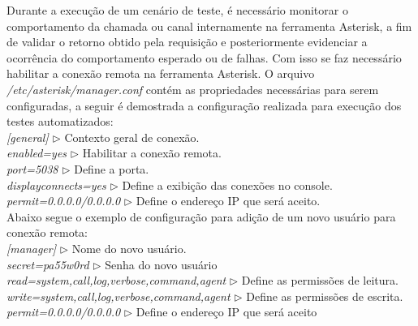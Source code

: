 Durante a execução de um cenário de teste, é necessário monitorar o comportamento da chamada ou canal internamente na ferramenta Asterisk,
a fim de validar o retorno obtido pela requisição e posteriormente evidenciar a ocorrência do comportamento esperado ou de falhas. Com isso se faz necessário habilitar a conexão remota na ferramenta Asterisk. O arquivo \textit{/etc/asterisk/manager.conf} contém as propriedades necessárias para serem configuradas, a seguir é demostrada a configuração realizada para execução dos testes automatizados:
\\
\hspace{10 mm}\textit{[general]} 			\hspace{10 mm} $\triangleright$ Contexto geral de conexão.\\
\hspace{10 mm}\textit{enabled=yes}  		\hspace{10 mm} $\triangleright$ Habilitar a conexão remota.\\
\hspace{10 mm}\textit{port=5038}  			\hspace{10 mm} $\triangleright$ Define a porta.\\
\hspace{10 mm}\textit{displayconnects=yes}  \hspace{10 mm} $\triangleright$ Define a exibição das conexões no console.\\
\hspace{10 mm}\textit{permit=0.0.0.0/0.0.0.0} \hspace{10 mm} $\triangleright$ Define o endereço IP que será aceito.\\

Abaixo segue o exemplo de configuração para adição de um novo usuário para conexão remota:
\\
\hspace{10 mm}\textit{[manager]} 	\hspace{10 mm} $\triangleright$ Nome do novo usuário.\\
\hspace{10 mm}\textit{secret=pa55w0rd} \hspace{10 mm} $\triangleright$ Senha do novo usuário \\
\hspace{10 mm}\textit{read=system,call,log,verbose,command,agent}  \hspace{10 mm} $\triangleright$ Define as permissões de leitura.\\
\hspace{10 mm}\textit{write=system,call,log,verbose,command,agent}  \hspace{10 mm} $\triangleright$ Define as permissões de escrita.\\
\hspace{10 mm}\textit{permit=0.0.0.0/0.0.0.0} \hspace{10 mm} $\triangleright$ Define o endereço IP que será aceito \\


